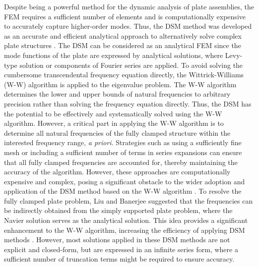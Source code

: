 \documentclass[preprint,12pt,number]{elsarticle}
\begin{document}
Despite being a powerful method for the dynamic analysis of plate assemblies, the FEM requires a sufficient number of elements and is computationally expensive to accurately capture higher-order modes.
Thus, the DSM method was developed as an accurate and efficient analytical approach to alternatively solve complex plate structures \cite{boscolo2011dynamic,fazzolari2013exact}. 
The DSM can be considered as an analytical FEM since the mode functions of the plate are expressed by analytical solutions, where Levy-type solution \cite{ghorbel2015dynamic} or components of Fourier series \cite{williams1995wave,banerjee2015dynamic,liu2016free,liu2024wavenumber,zhou2024wavenumber} are applied.
To avoid solving the cumbersome transcendental frequency equation directly, the Wittrick-Williams (W-W) algorithm \cite{wittrick1971general} is applied to the eigenvalue problem.
The W-W algorithm determines the lower and upper bounds of natural frequencies to arbitrary precision rather than solving the frequency equation directly. 
Thus, the DSM has the potential to be effectively and systematically solved using the W-W algorithm.
However, a critical part in applying the W-W algorithm is to determine all natural frequencies of the fully clamped structure within the interested frequency range, \textit{a priori}.
Strategies such as using a sufficiently fine mesh or including a sufficient number of terms in series expansions \cite{banerjee2015dynamic} can ensure that all fully clamped frequencies are accounted for, thereby maintaining the accuracy of the algorithm. 
However, these approaches are computationally expensive and complex, posing a significant obstacle to the wider adoption and application of the DSM method based on the W-W algorithm \cite{han2018improved,liu2022closed}.
To resolve the fully clamped plate problem, Liu and Banerjee \cite{liu2015exact} suggested that the frequencies can be indirectly obtained from the simply supported plate problem, where the Navier solution serves as the analytical solution. 
This idea provides a significant enhancement to the W-W algorithm, increasing the efficiency of applying DSM methods \cite{liu2024wavenumber,zhou2024wavenumber}. 
However, most solutions applied in these DSM methods are not explicit and closed-form, but are expressed in an infinite series form, where a sufficient number of truncation terms might be required to ensure accuracy.
\end{document}
